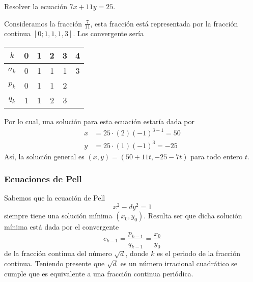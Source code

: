 \begin{example}
    Resolver la ecuación $7x + 11y = 25$.
\end{example}
\begin{solution}
    Consideramos la fracción $\frac{7}{11}$, esta fracción está representada por la fracción continua $[0;1,1,1,3]$.
    Los convergente sería
    \begin{table}[H]
        \centering
        \begin{tabular}{c||c|c|c|c|c}
            $k$ & 0 & 1 & 2 & 3 & 4 \\\hline\hline
            $a_k$ & 0 & 1 & 1 & 1 & 3\\
            $p_k$ & 0 & 1 & 1 & 2\\
            $q_k$ & 1 & 1 & 2 & 3\\
        \end{tabular}
    \end{table}
    Por lo cual, una solución para esta ecuación estaría dada por
    \begin{align*}
        x & = 25 \cdot (2) (-1)^{3 - 1} = 50 \\
        y & = 25 \cdot (1) (-1)^{3} = -25
    \end{align*}
    Así, la solución general es $(x,y) = (50 +11t, -25 - 7t)$ para todo entero $t$.
\end{solution}

\subsubsection{Ecuaciones de Pell}

Sabemos que la ecuación de Pell
\[
    x^2 - d y^2 = 1
\]
siempre tiene una solución mínima $(x_0, y_0)$.
Resulta ser que dicha solución mínima está dada por el convergente
\[
    c_{k - 1} = \frac{p_{k - 1}}{q_{k - 1}} = \frac{x_0}{y_0}
\]
de la fracción continua del número $\sqrt {d}$,
donde $k$ es el periodo de la fracción continua.
Teniendo presente que $\sqrt {d}$ es un número irracional cuadrático se cumple que es equivalente a una fracción continua periódica.

